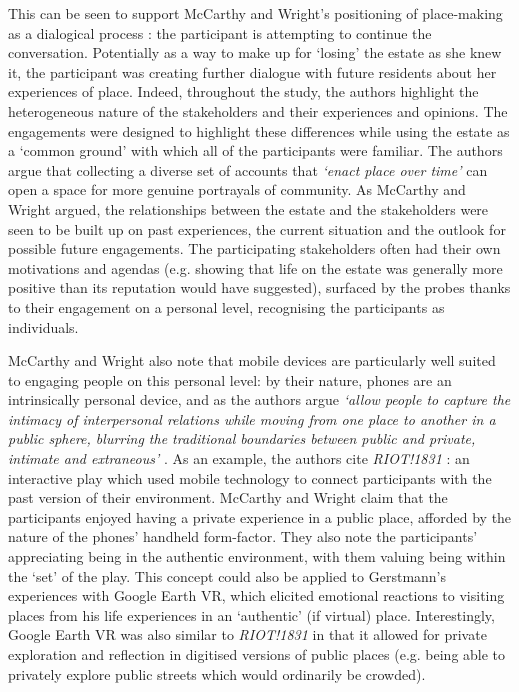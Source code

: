 This can be seen to support McCarthy and Wright's positioning of place-making as a dialogical process \citep{McCarthy2005}: the participant is attempting to continue the conversation. Potentially as a way to make up for `losing' the estate as she knew it, the participant was creating further dialogue with future residents about her experiences of place. Indeed, throughout the study, the authors highlight the heterogeneous nature of the stakeholders and their experiences and opinions. The engagements were designed to highlight these differences while using the estate as a `common ground' with which all of the participants were familiar. The authors argue that collecting a diverse set of accounts that \textit{`enact place over time'} can open a space for more genuine portrayals of community. As McCarthy and Wright argued, the relationships between the estate and the stakeholders were seen to be built up on past experiences, the current situation and the outlook for possible future engagements. The participating stakeholders often had their own motivations and agendas (e.g. showing that life on the estate was generally more positive than its reputation would have suggested), surfaced by the probes thanks to their engagement on a personal level, recognising the participants as individuals.

McCarthy and Wright also note that mobile devices are particularly well suited to engaging people on this personal level: by their nature, phones are an intrinsically personal device, and as the authors argue \textit{`allow people to capture the intimacy of interpersonal relations while moving from one place to another in a public sphere, blurring the traditional boundaries between public and private, intimate and extraneous'} \citep{McCarthy2005}. As an example, the authors cite \textit{RIOT!1831} \citep{Blythe2006}: an interactive play which used mobile technology to connect participants with the past version of their environment. McCarthy and Wright claim that the participants enjoyed having a private experience in a public place, afforded by the nature of the phones' handheld form-factor. They also note the participants' appreciating being in the authentic environment, with them valuing being within the `set' of the play. This concept could also be applied to Gerstmann's experiences with Google Earth VR, which elicited emotional reactions to visiting places from his life experiences in an `authentic' (if virtual) place. Interestingly, Google Earth VR was also similar to \textit{RIOT!1831} in that it allowed for private exploration and reflection in digitised versions of public places (e.g. being able to privately explore public streets which would ordinarily be crowded).

